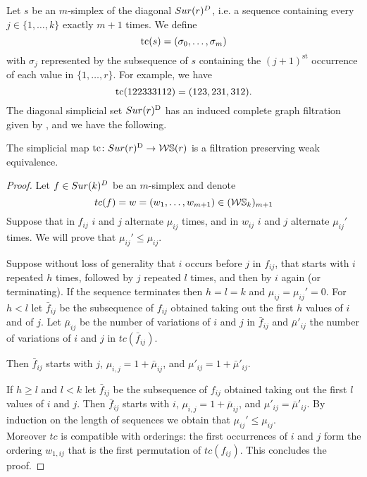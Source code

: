 Let $s$ be an $m$-simplex of the diagonal $Sur(r)^D$, i.e. a sequence containing every $j \in \{1,\dots,k\}$ exactly $m+1$ times.
We define
\[
\operatorname{tc}(s) = (\sigma_0,\dots,\sigma_m)
\]
with $\sigma_j$ represented by the subsequence of $s$ containing the $(j+1)^{\mathrm{st}}$ occurrence of each value in $\{1,\dots,r\}$.
For example, we have
\[
\operatorname{tc}(122333112) = (123,231,312).
\]
The diagonal simplicial set $Sur(r)^{\mathrm{D}}$ has an induced complete graph filtration given by , and we have the following.

\begin{theorem}
	The simplicial map $\operatorname{tc} \colon Sur(r)^{\mathrm{D}} \to \mathcal{W}\mathbb{S}(r)$ is a filtration preserving weak equivalence.
\end{theorem}


\begin{proof}
	Let $f\in Sur(k)^{D}$ be an $m$-simplex and denote
	$$tc(f)=w=(w_{1},\dots,w_{m+1})\in (\mathcal{W}\mathbb{S}_{k})_{m+1}$$
	Suppose that in $f_{ij}$ $i$ and $j$ alternate $\mu_{ij}$ times, and in $w_{ij}$ $i$ and $j$ alternate $\mu_{ij}'$ times.
	We will prove that
	$\mu_{ij}' \leq \mu_{ij}$.

	Suppose without loss of generality that $i$ occurs before $j$ in $f_{ij}$, that starts with $i$ repeated $h$ times, followed by $j$ repeated $l$ times, and
	then by $i$ again (or terminating).
	If the sequence terminates then $h=l=k$ and $\mu_{ij}=\mu_{ij}'=0$.
	For $h <l$
	let $\bar{f}_{ij}$ be the subsequence of $f_{ij}$
	obtained taking out the first $h$ values of $i$ and of $j$.
	Let $\bar{\mu}_{ij}$ be the number of variations of $i$ and $j$ in $\bar{f}_{ij}$
	and $\bar{\mu}'_{ij}$ the number of variations of $i$ and $j$ in $tc(\bar{f}_{ij})$.

	Then $\bar{f}_{ij}$
	starts with $j$,
	$\mu_{i,j}=1+\bar{\mu}_{ij}$,
	and $\mu'_{ij}=1+\bar{\mu}'_{ij}$.

	If $h \geq l$ and $l<k$
	let $\bar{f}_{ij}$ be the subsequence of $f_{ij}$ obtained taking out the first $l$ values of $i$ and $j$.
	Then $\bar{f}_{ij}$
	starts with $i$,
	$\mu_{i,j}=1+\bar{\mu}_{ij}$,
	and $\mu'_{ij}=\bar{\mu}'_{ij}$.
	By induction on the length of sequences we obtain that
	$\mu_{ij}'\le \mu_{ij}$.\\
	Moreover $tc$ is compatible with orderings: the first occurrences of $i$ and $j$ form the ordering $w_{1,ij}$ that is the first permutation of $tc(f_{ij})$.
	This concludes the proof.
\end{proof}


